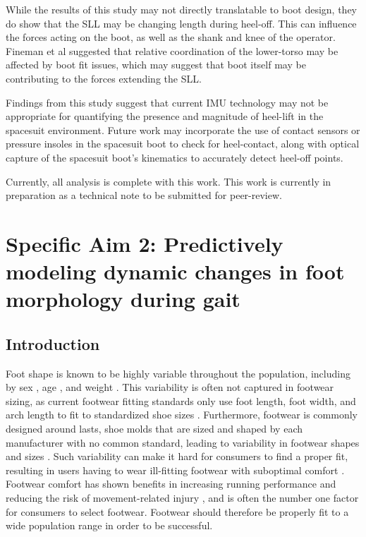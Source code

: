 \documentclass[defaultstyle,11pt]{comps}
\begin{document}
While the results of this study may not directly translatable to boot design, they do show that the SLL may be changing length during heel-off.
This can influence the forces acting on the boot, as well as the shank and knee of the operator.
Fineman et al \citep{Fineman2018} suggested that relative coordination of the lower-torso may be affected by boot fit issues, which may suggest that boot itself may be contributing to the forces extending the SLL.

Findings from this study suggest that current IMU technology may not be appropriate for quantifying the presence and magnitude of heel-lift in the spacesuit environment.
Future work may incorporate the use of contact sensors or pressure insoles in the spacesuit boot to check for heel-contact, along with optical capture of the spacesuit boot's kinematics to accurately detect heel-off points.

Currently, all analysis is complete with this work.
This work is currently in preparation as a technical note to be submitted for peer-review.

\hypertarget{specific-aim-2-predictively-modeling-dynamic-changes-in-foot-morphology-during-gait}{%
\chapter{Specific Aim 2: Predictively modeling dynamic changes in foot morphology during gait}\label{specific-aim-2-predictively-modeling-dynamic-changes-in-foot-morphology-during-gait}}

\hypertarget{introduction-1}{%
\section{Introduction}\label{introduction-1}}

Foot shape is known to be highly variable throughout the population, including by sex \citep{Wunderlich2001, Krauss2008, Krauss2010}, age \citep{Tomassoni2014}, and weight \citep{Price2016}.
This variability is often not captured in footwear sizing, as current footwear fitting standards only use foot length, foot width, and arch length to fit to standardized shoe sizes \citep{ASTM2017}.
Furthermore, footwear is commonly designed around lasts, shoe molds that are sized and shaped by each manufacturer with no common standard, leading to variability in footwear shapes and sizes \citep{Jurca2013, Wannop2019}.
Such variability can make it hard for consumers to find a proper fit, resulting in users having to wear ill-fitting footwear with suboptimal comfort \citep{Dobson2018b}.
Footwear comfort has shown benefits in increasing running performance \citep{Luo2009} and reducing the risk of movement-related injury \citep{Mundermann2001a}, and is often the number one \citep{Martinez-Martinez2017} factor for consumers to select footwear.
Footwear should therefore be properly fit to a wide population range in order to be successful.
\end{document}
